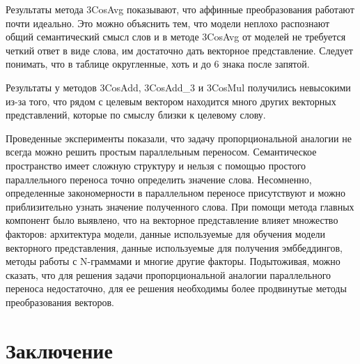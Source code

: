 \documentclass[a4paper,14pt]{article}
\begin{document}
Результаты метода 3CosAvg показывают, что аффинные преобразования работают почти идеально.
Это можно объяснить тем, что модели неплохо распознают общий семантический смысл слов и в методе 3CosAvg от моделей не требуется четкий ответ в виде слова, им достаточно дать векторное представление.
Следует понимать, что в таблице округленные, хоть и до 6 знака после запятой.

Результаты у методов 3CosAdd, 3CosAdd\_3 и 3CosMul получились невысокими из-за того, что рядом с целевым вектором находится много других векторных представлений, которые по смыслу близки к целевому слову.

Проведенные эксперименты показали, что задачу пропорциональной аналогии не всегда можно решить простым параллельным переносом.
Семантическое пространство имеет сложную структуру и нельзя с помощью простого параллельного переноса точно определить значение слова.
Несомненно, определенные закономерности в параллельном переносе присутствуют и можно приблизительно узнать значение полученного слова.
При помощи метода главных компонент было выявлено, что на векторное представление влияет множество факторов: архитектура модели, данные используемые для обучения модели векторного представления, данные используемые для получения эмббеддингов, методы работы с N-граммами и многие другие факторы.
Подытоживая, можно сказать, что для решения задачи пропорциональной аналогии параллельного переноса недостаточно, для ее решения необходимы более продвинутые методы преобразования векторов. 



%

\newpage
\section{Заключение}
\end{document}
